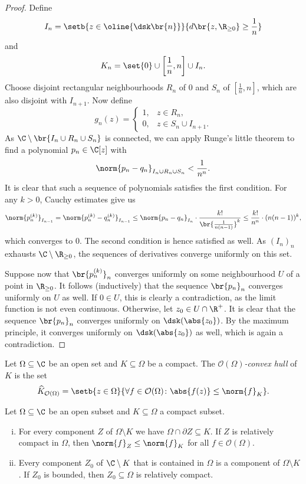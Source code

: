 \begin{proof}
Define
\[
I_n =
\setb{z \in \oline{\dsk \br{n}}}
{d \br{z, \R_{\geq 0}} \geq \frac{1}{n}}
\]
and
\[
K_n = \set{0} \cup \left[\frac{1}{n}, n \right] \cup I_n.
\]
Choose disjoint rectangular neighbourhoods $R_n$ of $0$ and $S_n$
of $\left[\frac{1}{n}, n \right]$, which are also disjoint with
$I_{n+1}$. Now define
\[
g_n(z) =
\begin{cases}
1, & z \in R_n,              \\
0, & z \in S_n \cup I_{n+1}.
\end{cases}
\]
As $\C \setminus \br{I_n \cup R_n \cup S_n}$ is connected, we can
apply Runge's little theorem to find a polynomial $p_n \in \C[z]$
with
\[
\norm{p_n - q_n}_{I_n \cup R_n \cup S_n} < \frac{1}{n^n}.
\]
It is clear that such a sequence of polynomials satisfies the first
condition. For any $k > 0$, Cauchy estimates give us
\[
\norm{p_n^{(k)}}_{I_{n-1}} =
\norm{p_n^{(k)} - q_n^{(k)}}_{I_{n-1}} \leq
\norm{p_n - q_n}_{I_n} \cdot
\frac{k!}{\br{\frac{1}{n(n-1)}}^k} \leq
\frac{k!}{n^n} \cdot (n(n-1))^k,
\]
which converges to $0$. The second condition is hence satisfied as
well. As $(I_n)_n$ exhausts $\C \setminus \R_{\geq 0}$, the
sequences of derivatives converge uniformly on this set.

Suppose now that $\br{p_n^{(k)}}_n$ converges uniformly on some
neighbourhood $U$ of a point in $\R_{\geq 0}$. It follows
(inductively) that the sequence $\br{p_n}_n$ converges uniformly on
$U$ as well. If $0 \in U$, this is clearly a contradiction, as the
limit function is not even continuous. Otherwise, let
$z_0 \in U \cap \R^+$. It is clear that the sequence $\br{p_n}_n$
converges uniformly on $\dsk(\abs{z_0})$. By the maximum principle,
it converges uniformly on $\dsk(\abs{z_0})$ as well, which is again
a contradiction.
\end{proof}

\begin{definicija}
Let $\Omega \subseteq \C$ be an open set and $K \subseteq \Omega$
be a compact. The
\emph{$\mathcal{O}(\Omega)$-convex hull}
of $K$ is the set
\[
\widehat{K}_{\mathcal{O}(\Omega)} =
\setb{z \in \Omega}
{\forall f \in \mathcal{O}(\Omega) \colon
\abs{f(z)} \leq \norm{f}_K}.
\]
\end{definicija}


\begin{lema}
Let $\Omega \subseteq \C$ be an open subset and
$K \subseteq \Omega$ a compact subset.

\begin{enumerate}[i)]
\item For every component $Z$ of $\Omega \setminus K$ we have
$\Omega \cap \partial{Z} \subseteq K$. If $Z$ is relatively compact
in $\Omega$, then $\norm{f}_Z \leq \norm{f}_K$ for all
$f \in \mathcal{O}(\Omega)$.
\item Every component $Z_0$ of $\C \setminus K$ that is contained
in $\Omega$ is a component of $\Omega \setminus K$. If $Z_0$ is
bounded, then $Z_0 \subseteq \Omega$ is relatively compact.
\end{enumerate}
\end{lema}

